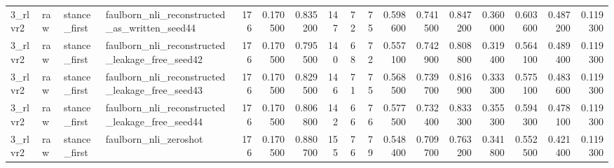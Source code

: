 \begin{tabular}{llllrrrrrrrrrrrrr}
3_rlvr2 & raw & stance_first & faulborn_nli_reconstructed_as_written_seed44 & 176 & 0.170500 & 0.835200 & 147 & 72 & 75 & 0.598600 & 0.741500 & 0.847200 & 0.360000 & 0.603600 & 0.487200 & 0.119300 \\
3_rlvr2 & raw & stance_first & faulborn_nli_reconstructed_leakage_free_seed42 & 176 & 0.170500 & 0.795500 & 140 & 68 & 72 & 0.557100 & 0.742900 & 0.808800 & 0.319400 & 0.564100 & 0.489400 & 0.119300 \\
3_rlvr2 & raw & stance_first & faulborn_nli_reconstructed_leakage_free_seed43 & 176 & 0.170500 & 0.829500 & 146 & 71 & 75 & 0.568500 & 0.739700 & 0.816900 & 0.333300 & 0.575100 & 0.483600 & 0.119300 \\
3_rlvr2 & raw & stance_first & faulborn_nli_reconstructed_leakage_free_seed44 & 176 & 0.170500 & 0.806800 & 142 & 66 & 76 & 0.577500 & 0.732400 & 0.833300 & 0.355300 & 0.594300 & 0.478100 & 0.119300 \\
3_rlvr2 & raw & stance_first & faulborn_nli_zeroshot & 176 & 0.170500 & 0.880700 & 155 & 76 & 79 & 0.548400 & 0.709700 & 0.763200 & 0.341800 & 0.552500 & 0.421400 & 0.119300 \\
\bottomrule
\end{tabular}

